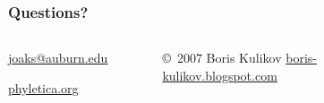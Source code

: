 \begin{frame}
    \frametitle{Questions?}    
    \begin{columns}[c]

        \begin{minipage}[c][\frametextheight][c]{\columnwidth}
        \begin{center}
            {
            \Large
            \href{mailto:joaks@auburn.edu}{joaks@auburn.edu}

            \bigskip
            \href{http://phyletica.org/}{phyletica.org}
            }
        \end{center}
        \end{minipage}


        \begin{minipage}[t][\frametextheight][b]{\columnwidth}
            \begin{figure}
                \begin{center}
                \vspace{-2.0mm}
                \caption{\tiny \copyright~2007 Boris Kulikov \href{http://boris-kulikov.blogspot.com/}{boris-kulikov.blogspot.com}}
                \end{center}
            \end{figure}
        \end{minipage}

    \end{columns}
\end{frame}

% 











